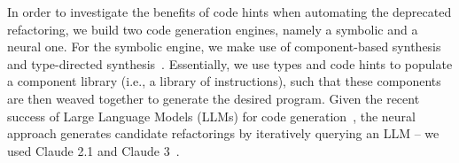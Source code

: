 \documentclass[sigconf,review,anonymous]{acmart}
\begin{document}

In order to investigate the benefits of code hints when automating the deprecated refactoring,
we build two code generation engines, namely a symbolic and a neural one.
%
For the symbolic engine, we make use of component-based synthesis~\cite{DBLP:conf/icse/JhaGST10,DBLP:conf/pldi/GulwaniJTV11,DBLP:conf/popl/FengM0DR17}
and type-directed synthesis~\cite{DBLP:conf/sfp/Katayama05,DBLP:conf/pldi/OseraZ15,DBLP:journals/pacmpl/YamaguchiMDW21}. Essentially, we use types and code hints to populate
a component library (i.e., a library of instructions), such that these components are then weaved together to generate the desired program.
Given the recent success of Large Language Models (LLMs) for code generation~\cite{chen2022codet,DBLP:journals/corr/abs-2108-07732,DBLP:journals/corr/abs-2302-05527,DBLP:journals/corr/abs-2202-13169,llmsforcodecompletion,codegenclasslevel,ni2023lever,zhang2023repocoder,lostintranslation,Ding2024cocomic,yang2024sweagent}, the neural approach 
generates candidate refactorings by iteratively querying an LLM -- we used Claude 2.1 and Claude 3~\cite{claude}.

\end{document}
